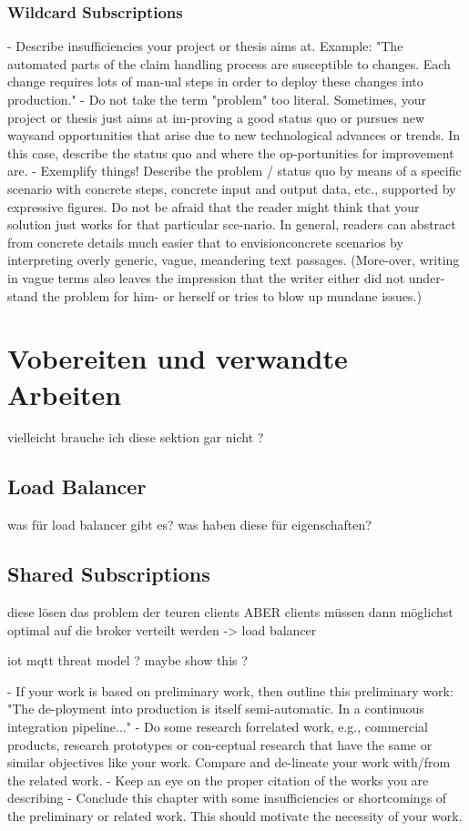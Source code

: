 \subsubsection{Wildcard Subscriptions}

- Describe insufficiencies your project or thesis aims at. Example: "The automated parts of the claim handling process are susceptible to changes. Each change requires lots of man-ual steps in order to deploy these changes into production."
- Do not take the term "problem" too literal. Sometimes, your project or thesis just aims at im-proving a good status quo or pursues new waysand opportunities that arise due to new technological advances or trends. In this case, describe the status quo and where the op-portunities for improvement are.
- Exemplify things! Describe the problem / status quo by means of a specific scenario with concrete steps, concrete input and output data, etc., supported by expressive figures. Do not be afraid that the reader might think that your solution just works for that particular sce-nario. In general, readers can abstract from concrete details much easier that to envisionconcrete scenarios by interpreting overly generic, vague, meandering text passages. (More-over, writing in vague terms also leaves the impression that the writer either did not under-stand the problem for him- or herself or tries to blow up mundane issues.)

\section{Vobereiten und verwandte Arbeiten}
vielleicht brauche ich diese sektion gar nicht ?

\subsection{Load Balancer}
was für load balancer gibt es? was haben diese für eigenschaften?

\subsection{Shared Subscriptions}
diese lösen das problem der teuren clients ABER clients müssen dann möglichst optimal auf die broker verteilt werden
-> load balancer

iot mqtt threat model ? maybe show this ?

- If your work is based on preliminary work, then outline this preliminary work: "The de-ployment into production is itself semi-automatic. In a continuous integration pipeline..."
- Do some research forrelated work, e.g., commercial products, research prototypes or con-ceptual research that have the same or similar objectives like your work. Compare and de-lineate your work with/from the related work.
- Keep an eye on the proper citation of the works you are describing
- Conclude this chapter with some insufficiencies or shortcomings of the preliminary or related work. This should motivate the necessity of your work.

